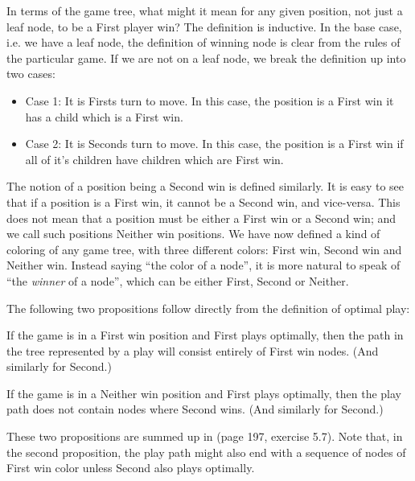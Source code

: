 In terms of the game tree, what might it mean for any given position, not just a leaf node, to be a First player win? The definition is inductive.
In the base case, i.e. we have a leaf node, the definition of winning node is clear from the rules of the particular game.
If we are not on a leaf node, we break the definition up into two cases:

\begin{definition}
\label{def:positionclasses}

\begin{itemize}
  \item Case 1: It is Firsts turn to move. In this case, the position is a First win it has a child which is a First win.

  \item Case 2: It is Seconds turn to move. In this case, the position is a First win if all of it's children have children which are First win.

\end{itemize}

\end{definition}

The notion of a position being a Second win is defined similarly.
It is easy to see that if a position is a First win, it cannot be a Second win, and vice-versa.
This does not mean that a position must be either a First win or a Second win; and we call such positions Neither win positions.
We have now defined a kind of coloring of any game tree, with three different colors: First win, Second win and Neither win.
Instead saying ``the color of a node'', it is more natural to speak of ``the \emph{winner} of a node'', which can be either First, Second or Neither.

The following two propositions follow directly from the definition of optimal play:

\begin{proposition}
If the game is in a First win position and First plays optimally, then the path in the tree represented by a play will consist entirely of First win nodes.
(And similarly for Second.)
\end{proposition}

\begin{proposition}
If the game is in a Neither win position and First plays optimally, then the play path does not contain nodes where Second wins.
(And similarly for Second.)
\end{proposition}

These two propositions are summed up in \citep{aimodernapproach} (page 197, exercise 5.7).
Note that, in the second proposition, the play path might also end with a sequence of nodes of First win color unless Second also plays optimally.

